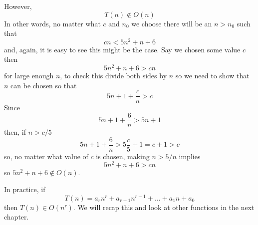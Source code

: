 \documentclass[11pt,a4paper]{scrartcl}
\begin{document}
However, 
\begin{equation}
T(n)\not\in O(n)
\end{equation}
In other words, no matter what $c$ and $n_0$ we choose there will be an $n>n_0$ such that
\begin{equation}
cn<5n^2+n+6
\end{equation}
and, again, it is easy to see this might be the case. Say we chosen
some value $c$ then
\begin{equation}
5n^2+n+6>cn
\end{equation}
for large enough $n$, to check this divide both sides by $n$ so we need to show that $n$ can be chosen so that
\begin{equation}
5n+1+\frac{c}{n}>c
\end{equation}
Since 
\begin{equation}
5n+1+\frac{6}{n}>5n+1
\end{equation}
then, if $n>c/5$
\begin{equation}
5n+1+\frac{6}{n}>5\frac{c}{5}+1=c+1>c
\end{equation}
so, no matter what value of $c$ is chosen, making $n>5/n$ implies
\begin{equation}
5n^2+n+6>cn
\end{equation}
so $5n^2+n+6\not\in O(n)$. 

In practice, if
\begin{equation}
T(n)=a_rn^r+a_{r-1}n^{r-1}+\ldots+a_1n+a_0
\end{equation}
then $T(n)\in O(n^r)$. We will recap this and look at other functions in the next chapter.
\end{document}
